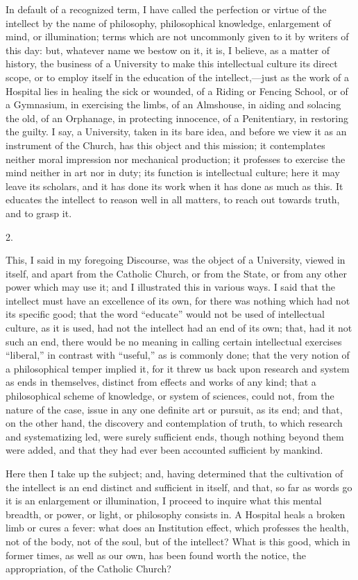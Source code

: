 In default of a recognized term, I have called the perfection or
virtue of the intellect by the name of philosophy, philosophical
knowledge, enlargement of mind, or illumination; terms which are not
uncommonly given to it by writers of this day: but, whatever name we
bestow on it, it is, I believe, as a matter of history, the business
of a University to make this intellectual culture its direct scope, or
to employ itself in the education of the intellect,—just as the work
of a Hospital lies in healing the sick or wounded, of a Riding or
Fencing School, or of a Gymnasium, in exercising the limbs, of an
Almshouse, in aiding and solacing the old, of an Orphanage, in
protecting innocence, of a Penitentiary, in restoring the guilty. I
say, a University, taken in its bare idea, and before we view it as an
instrument of the Church, has this object and this mission; it
contemplates neither moral impression nor mechanical production; it
professes to exercise the mind neither in art nor in duty; its
function is intellectual culture; here it may leave its scholars, and
it has done its work when it has done as much as this. It educates the
intellect to reason well in all matters, to reach out towards
truth, and to grasp it.

2.

This, I said in my foregoing Discourse, was the object of a
University, viewed in itself, and apart from the Catholic Church, or
from the State, or from any other power which may use it; and I
illustrated this in various ways. I said that the intellect must have
an excellence of its own, for there was nothing which had not its
specific good; that the word ``educate'' would not be used of
intellectual culture, as it is used, had not the intellect had an end
of its own; that, had it not such an end, there would be no meaning in
calling certain intellectual exercises ``liberal,'' in
contrast with ``useful,'' as is commonly done; that the very
notion of a philosophical temper implied it, for it threw us back upon
research and system as ends in themselves, distinct from effects and
works of any kind; that a philosophical scheme of knowledge, or system
of sciences, could not, from the nature of the case, issue in any one
definite art or pursuit, as its end; and that, on the other hand, the
discovery and contemplation of truth, to which research and
systematizing led, were surely sufficient ends, though nothing beyond
them were added, and that they had ever been accounted sufficient by
mankind.

Here then I take up the subject; and, having determined that the
cultivation of the intellect is an end distinct and sufficient in
itself, and that, so far as words go it is an enlargement or
illumination, I proceed to inquire what this mental breadth, or power,
or light, or philosophy consists in. A Hospital heals a broken limb or
cures a fever: what does an Institution effect, which professes the
health, not of the body, not of the soul, but of the intellect?
What is this good, which in former times, as well as our own, has been
found worth the notice, the appropriation, of the Catholic Church?


